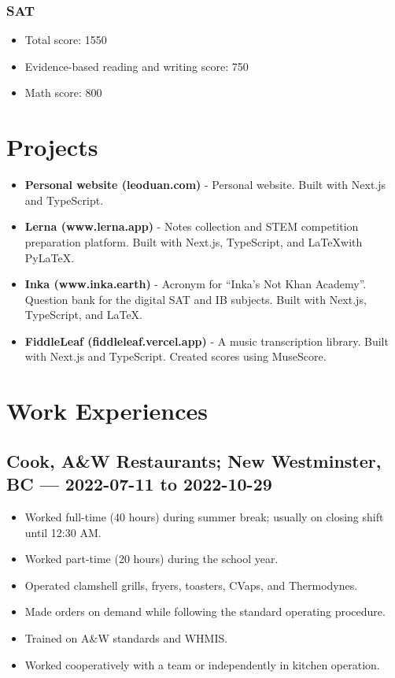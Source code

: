 \documentclass{article}
\begin{document}
\subsubsection*{SAT}

\begin{itemize}
	\item Total score: 1550
	\item Evidence-based reading and writing score: 750
	\item Math score: 800
\end{itemize}

\section*{Projects}

\begin{itemize}
	\item \textbf{Personal website (leoduan.com)} - Personal website. Built with Next.js and TypeScript.
	\item \textbf{Lerna (www.lerna.app)} - Notes collection and STEM competition preparation platform. Built with Next.js, TypeScript, and \LaTeX with PyLaTeX.
	\item \textbf{Inka (www.inka.earth)} - Acronym for ``Inka's Not Khan Academy''. Question bank for the digital SAT and IB subjects. Built with Next.js, TypeScript, and \LaTeX.
	\item \textbf{FiddleLeaf (fiddleleaf.vercel.app)} - A music transcription library. Built with Next.js and TypeScript. Created scores using MuseScore.
\end{itemize}

\section*{Work Experiences}

\subsection*{Cook, A\&W Restaurants; New Westminster, BC — 2022-07-11 to 2022-10-29}

\begin{itemize}
	\item Worked full-time (40 hours) during summer break; usually on closing shift until 12:30 AM.
	\item Worked part-time (20 hours) during the school year.
	\item Operated clamshell grills, fryers, toasters, CVaps, and Thermodynes.
	\item Made orders on demand while following the standard operating procedure.
	\item Trained on A\&W standards and WHMIS.
	\item Worked cooperatively with a team or independently in kitchen operation.
\end{itemize}
\end{document}
